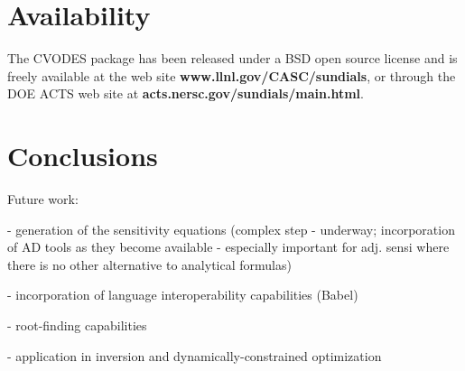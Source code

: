 \section{Availability}\label{s:availability}

The CVODES package has been released under a BSD open source license and is 
freely available at the web site
{\bf www.llnl.gov/CASC/sundials},
or through the DOE ACTS web site at
{\bf acts.nersc.gov/sundials/main.html}.

\section{Conclusions}\label{s:conclusions}

Future work:

- generation of the sensitivity equations (complex step - underway; incorporation
of AD tools as they become available - especially important for adj. sensi where
there is no other alternative to analytical formulas)

- incorporation of language interoperability capabilities (Babel)

- root-finding capabilities

- application in inversion and dynamically-constrained optimization